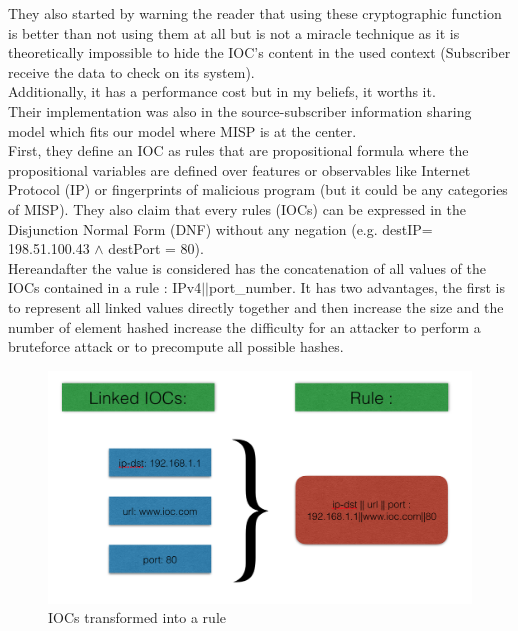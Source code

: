 \documentclass{eplmastersthesis}
\begin{document}
They also started by warning the reader that using these cryptographic function is better than not using them at all but is not a miracle technique as it is theoretically impossible to hide the IOC’s content in the used context (Subscriber receive the data to check on its system).\\
Additionally, it has a performance cost but in my beliefs, it worths it.\\ Their implementation was also in the source-subscriber information sharing model which fits our model where MISP is at the center.\\
First, they define an IOC as rules that are propositional formula where the propositional variables are defined over features or observables like Internet Protocol (IP) or fingerprints of malicious program (but it could be any categories of MISP). They also claim that every rules (IOCs) can be expressed in the Disjunction Normal Form (DNF) without any negation (e.g. destIP= 198.51.100.43 $\land$ destPort = 80).\\
Hereandafter the value is considered has the concatenation of all values of the IOCs contained in a rule : IPv4$||$port\_number. It has two advantages, the first is to represent all linked values directly together and then increase the size and the number of element hashed increase the difficulty for an attacker to perform a bruteforce attack or to precompute all possible hashes.\\

\begin{figure}[h!]
\begin{center}
	\includegraphics[scale=0.5]{res/ioc-rules}
	\caption{IOCs transformed into a rule}
	\label{IOC-To-Rule}
\end{center}
\end{figure}
\end{document}
